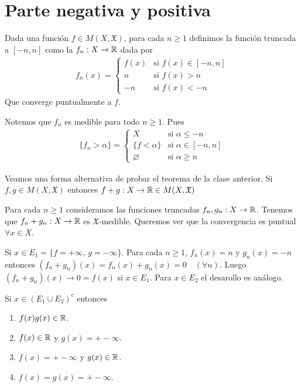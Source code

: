 \section{Parte negativa y positiva}

\begin{definition}
    Dada una función $f \in M(X, \mathfrak{X})$, para cada $n \geq 1$ definimos la función truncada a $[-n ,n]$ como la $f_n : X \to \mathbb{R}$ dada por
    \begin{align*}
        f_n(x) = \begin{cases}
                     f(x) & \text{si } f(x) \in [-n, n] \\
                     n    & \text{si } f(x) > n         \\
                     -n   & \text{si } f(x) < -n
                 \end{cases}
    \end{align*}
    Que converge puntualmente a $f$.
\end{definition}

Notemos que $f_n$ es medible para todo $n \geq 1$. Pues \begin{align*}
    \{ f_n > \alpha \} = \begin{cases}
                             X                & \text{si } \alpha \leq -n     \\
                             \{ f < \alpha \} & \text{si } \alpha \in [-n, n] \\
                             \varnothing        & \text{si } \alpha \geq n
                         \end{cases}
\end{align*}

Veamos una forma alternativa de probar el teorema de la clase anterior.
Si $f, g \in M(X, \mathfrak{X})$ entonces $f + g: X \to \mathbb{R} \in M(X, \mathfrak{X})$

Para cada $n \geq 1$ consideramos las funciones truncadas $f_n, g_n : X \to \mathbb{R}$.
Tenemos que $f_n + g_n : X \to \mathbb{R}$ es $\mathfrak{X}$-medible. Queremos ver que la convergencia es puntual $\forall x \in X$.

Si $x \in E_1 = \{ f = +\infty \text{, } g = -\infty \}$. Para cada $n \geq 1$,
$f_n(x) = n$ y $g_n(x) = -n$ entonces $(f_n + g_n)(x) = f_n(x) + g_n(x) = 0 \quad (\forall n)$.
Luego $(f_n + g_n)(x) \to 0 = f(x)$ si $x \in E_1$. Para $x \in E_2$ el desarollo es análogo.

Si $x \in (E_1 \cup E_2)^c$ entonces \begin{enumerate}
    \item $f(x)g(x) \in \mathbb{R}$.
    \item $f(x) \in \mathbb{R}$ y $g(x) = +-\infty$.
    \item $f(x) = +-\infty$ y $g(x) \in \mathbb{R}$.
    \item $f(x) = g(x) = +-\infty$.
\end{enumerate}


